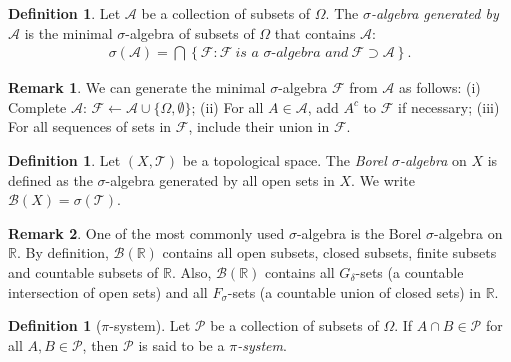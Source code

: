 \documentclass{article}
\numberwithin{equation}{section}
\theoremstyle{plain}
\theoremstyle{definition}
\newtheorem{definition}[theorem]{Definition}
\newtheorem*{remark}{Remark}
\begin{document}
\begin{definition}\label{def:1.2}
Let $\mathscr{A}$ be a collection of subsets of $\Omega$. The \textit{$\sigma$-algebra generated by $\mathscr{A}$} is the minimal $\sigma$-algebra of subsets of $\Omega$ that contains $\mathscr{A}$:
\begin{align*}
	\sigma(\mathscr{A}) = \bigcap\left\{\mathscr{F}:\mathscr{F}\ \textit{is a $\sigma$-algebra and}\ \mathscr{F}\supset\mathscr{A}\right\}.
\end{align*}
\end{definition}

\begin{remark} We can generate the minimal $\sigma$-algebra $\mathscr{F}$ from $\mathscr{A}$ as follows: (i) Complete $\mathscr{A}$: $\mathscr{F}\leftarrow\mathscr{A}\cup\{\Omega,\emptyset\}$; (ii) For all $A\in\mathscr{A}$, add $A^c$ to $\mathscr{F}$ if necessary; (iii) For all sequences of sets in $\mathscr{F}$, include their union in $\mathscr{F}$.
\end{remark}

\begin{definition}\label{def:1.3} 
Let $(X,\mathscr{T})$ be a topological space. The \textit{Borel $\sigma$-algebra} on $X$ is defined as the $\sigma$-algebra generated by all open sets in $X$. We write $\mathscr{B}(X)=\sigma(\mathscr{T})$.
\end{definition}
\begin{remark} One of the most commonly used $\sigma$-algebra is the Borel $\sigma$-algebra on $\mathbb{R}$. By definition, $\mathscr{B}(\mathbb{R})$ contains all open subsets, closed subsets, finite subsets and countable subsets of $\mathbb{R}$. Also, $\mathscr{B}(\mathbb{R})$ contains all $G_\delta$-sets (a countable intersection of open sets) and all $F_\sigma$-sets (a countable union of closed sets) in $\mathbb{R}$.
\end{remark}

\begin{definition}[$\pi$-system]\label{def:1.4} Let $\mathscr{P}$ be a collection of subsets of $\Omega$. If $A\cap B\in\mathscr{P}$ for all $A,B\in\mathscr{P}$, then $\mathscr{P}$ is said to be a \textit{$\pi$-system}.
\end{definition}
\end{document}
